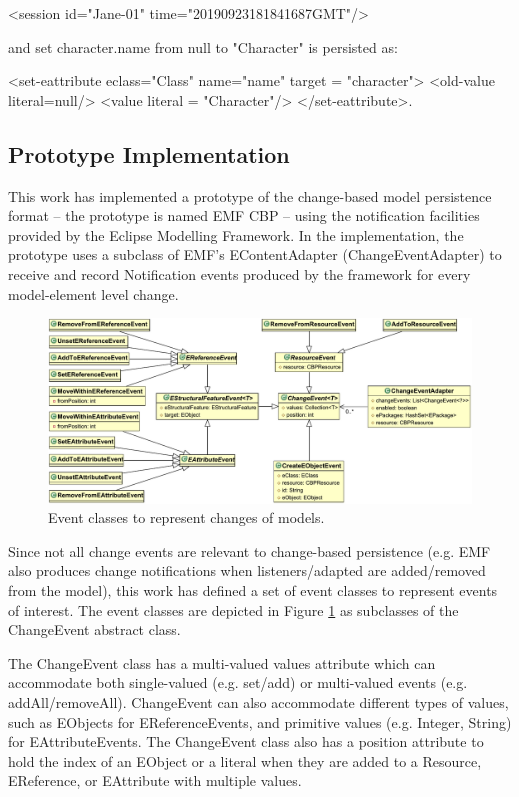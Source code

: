 \textsf{<session id="Jane-01" time="20190923181841687GMT"/>} 

and \textsf{set character.name from null to "Character"} is persisted as:

\textsf{<set-eattribute eclass="Class" name="name" 
target = "character">
<old-value literal=null/>
<value literal = "Character"/>
</set-eattribute>}.

\subsection{Prototype Implementation}
\label{sec:prototype_implementation}
This work has implemented a prototype \cite{epsilonlabs2019emfcbp} of the change-based model persistence format -- the prototype is named EMF CBP -- using the notification facilities provided by the Eclipse Modelling Framework. In the implementation, the prototype uses a subclass of EMF's \textsf{EContentAdapter} (\textsf{ChangeEventAdapter}) to receive and record \textsf{Notification} events produced by the framework for every model-element level change.

\begin{figure}[th]
  \centering
  \includegraphics[width=\linewidth]{events}
  \caption{Event classes to represent changes of models.}
  \label{fig:events}
\end{figure}

Since not all change events are relevant to change-based persistence (e.g. EMF also produces change notifications when listeners/adapted are added/removed from the model), this work has defined a set of event classes to represent events of interest. The event classes are depicted in Figure \ref{fig:events} as subclasses of the \textsf{ChangeEvent} abstract class.

The \textsf{ChangeEvent} class has a multi-valued \textsf{values} attribute which can accommodate both single-valued (e.g. set/add) or multi-valued events (e.g. addAll/removeAll). \textsf{ChangeEvent} can also accommodate different types of values, such as \textsf{EObject}s for \textsf{EReferenceEvents}, and primitive values (e.g. Integer, String) for \textsf{EAttributeEvents}. The \textsf{ChangeEvent} class also has a position attribute to hold the  index of an \textsf{EObject} or a literal when they are added to a \textsf{Resource}, \textsf{EReference}, or \textsf{EAttribute} with multiple values. 

